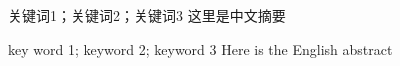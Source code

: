 
\begin{cnabstract}{关键词1；关键词2；关键词3}
这里是中文摘要

\end{cnabstract}


\begin{enabstract}{key word 1; keyword 2; keyword 3}
Here is the English abstract
\end{enabstract}
